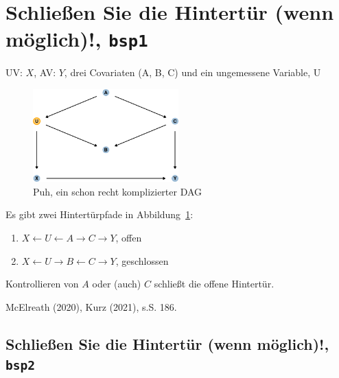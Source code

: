 \documentclass[
  a4paper,
  DIV=11]{scrreprt}
\providecommand{\tightlist}{%
  \setlength{\itemsep}{0pt}\setlength{\parskip}{0pt}}\usepackage{longtable,booktabs,array}
\theoremstyle{definition}
\theoremstyle{remark}
\begin{document}
\hypertarget{schlieuxdfen-sie-die-hintertuxfcr-wenn-muxf6glich-bsp1}{%
\section{\texorpdfstring{Schließen Sie die Hintertür (wenn möglich)!,
\texttt{bsp1}}{Schließen Sie die Hintertür (wenn möglich)!, bsp1}}\label{schlieuxdfen-sie-die-hintertuxfcr-wenn-muxf6glich-bsp1}}

UV: \(X\), AV: \(Y\), drei Covariaten (A, B, C) und ein ungemessene
Variable, U

\begin{figure}

{\centering \includegraphics[width=0.5\textwidth,height=\textheight]{./kausal_files/figure-pdf/fig-dag-fancy-1.pdf}

}

\caption{\label{fig-dag-fancy}Puh, ein schon recht komplizierter DAG}

\end{figure}

Es gibt zwei Hintertürpfade in Abbildung~\ref{fig-dag-fancy}:

\begin{enumerate}
\def\labelenumi{\arabic{enumi}.}
\tightlist
\item
  \(X \leftarrow U \leftarrow A \rightarrow C \rightarrow Y\), offen
\item
  \(X \leftarrow U \rightarrow B \leftarrow C \rightarrow Y\),
  geschlossen
\end{enumerate}

Kontrollieren von \(A\) oder (auch) \(C\) schließt die offene Hintertür.

McElreath (2020), Kurz (2021), s.S. 186.

\hypertarget{schlieuxdfen-sie-die-hintertuxfcr-wenn-muxf6glich-bsp2}{%
\subsection{\texorpdfstring{Schließen Sie die Hintertür (wenn möglich)!,
\texttt{bsp2}}{Schließen Sie die Hintertür (wenn möglich)!, bsp2}}\label{schlieuxdfen-sie-die-hintertuxfcr-wenn-muxf6glich-bsp2}}
\end{document}
